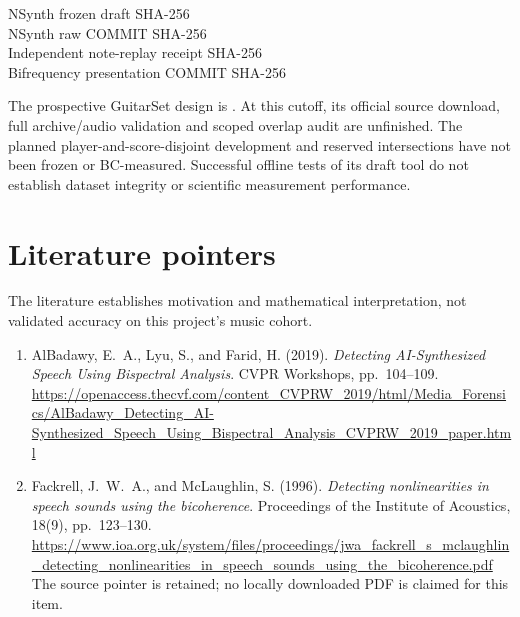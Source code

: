 \documentclass[11pt,a4paper]{article}
\begin{document}
\begin{description}
\item[NSynth frozen draft SHA-256]
\item[NSynth raw COMMIT SHA-256]
\item[Independent note-replay receipt SHA-256]
\item[Bifrequency presentation COMMIT SHA-256]
\end{description}

The prospective GuitarSet design is
. At this cutoff, its official source
download, full archive/audio validation and scoped overlap audit are unfinished.
The planned player-and-score-disjoint development and reserved intersections
have not been frozen or BC-measured. Successful offline tests of its draft tool
do not establish dataset integrity or scientific measurement performance.

\section{Literature pointers}
The literature establishes motivation and mathematical interpretation, not
validated accuracy on this project's music cohort.
\begin{enumerate}
\item AlBadawy, E.~A., Lyu, S., and Farid, H. (2019).
\emph{Detecting AI-Synthesized Speech Using Bispectral Analysis}.
CVPR Workshops, pp.~104--109.
\url{https://openaccess.thecvf.com/content_CVPRW_2019/html/Media_Forensics/AlBadawy_Detecting_AI-Synthesized_Speech_Using_Bispectral_Analysis_CVPRW_2019_paper.html}
\item Fackrell, J.~W.~A., and McLaughlin, S. (1996).
\emph{Detecting nonlinearities in speech sounds using the bicoherence}.
Proceedings of the Institute of Acoustics, 18(9), pp.~123--130.
\url{https://www.ioa.org.uk/system/files/proceedings/jwa_fackrell_s_mclaughlin_detecting_nonlinearities_in_speech_sounds_using_the_bicoherence.pdf}
The source pointer is retained; no locally downloaded PDF is claimed for this item.
\end{enumerate}
\end{document}
